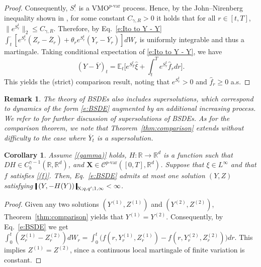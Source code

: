 \documentclass[11pt,reqno]{amsart}
\newtheorem{corollary}[lemma]{Corollary}
\newtheorem{remark}[lemma]{Remark}
\numberwithin{equation}{section}
\def\R{\mathbb R}
\def\E{\mathbb E}
\newcommand{\shortthickbar}{%
  \vcenter{\hbox{\rule{1.8pt}{2.2ex}}}%
}
\newcommand{\thicknm}[1]{%
  \mathopen{\shortthickbar}%
  \mkern4mu #1 \mkern4mu%
  \mathclose{\shortthickbar}%
}
\begin{document}
\begin{proof}
Consequently, $S^t_{\bm\cdot}$ is a $\mathrm{VMO}^{p\text{-}\mathrm{var}}$ process. Hence, by the John--Nirenberg inequality shown in \cite[Theorem~3.4]{le2022quantitative}, for some constant $C_{\gamma,R} > 0$ it holds that for all $r\in[t,T]$, 
$
\|e^{S^{t}_{r}}\|_{2} \le C_{\gamma,R}.
$
Therefore, by Eq.~\eqref{e:Ito to Y - Y} $\int_{t}^{\bm\cdot} [ e^{S^{t}_{r}}(Z_r - \overline Z_r) + \theta_r e^{S^{t}_{r}} (Y_r - \overline Y_r) ] dW_r$ is uniformly integrable and thus a martingale. Taking conditional expectation of \eqref{e:Ito to Y - Y}, we have 
\begin{equation*}
(Y - \overline Y)_{t} = \E_{t} \Big[e^{S^{t}_{T}} \hat \xi + \int_{t}^{T} e^{S^{t}_{r}} \hat f_r dr \Big].
\end{equation*}
This yields the (strict) comparison result, noting that $e^{S_r^t} > 0$  and $\hat f_r \ge 0$ a.s.
\end{proof}

\begin{remark}\label{rem:comparison to sup solution}
The theory of BSDEs also includes supersolutions, which correspond to dynamics of the form \eqref{e:BSDE} augmented by an additional increasing process. We refer to \cite{el1997backward} for further discussion of supersolutions of BSDEs. As for the comparison theorem, we note that Theorem~\ref{thm:comparison} extends without difficulty to the case where $\overline Y_t$ is a supersolution.
\end{remark}

\begin{corollary}\label{cor:uniqueness}
Assume \ref{(gamma)} holds,  $H:\R\to\R^d$ is a function such that $DH\in C^{\gamma - 1}_{b}(\R,\R^d)$, and $\mathbf X \in \mathscr{C}^{p\text{-}\mathrm{var}}([0,T],\R^d)$. Suppose that $\xi \in L^{\infty}$ and that $f$ satisfies \ref{(f)}. Then, Eq.~\eqref{e:BSDE} admits at most one solution $(Y,Z)$ satisfying $\thicknm{(Y,-H(Y))}_{\mathrm X;q,q';1,\infty} < \infty$.
\end{corollary}

\begin{proof}
Given any two solutions $(Y^{(1)},Z^{(1)})$ and $(Y^{(2)},Z^{(2)})$, Theorem~\ref{thm:comparison} yields that $Y^{(1)} = Y^{(2)}$. Consequently, by  Eq.~\eqref{e:BSDE} we get $\int_{0}^{t}(Z^{(1)}_{r} -Z^{(2)}_{r})dW_{r} = \int_{0}^{t}\big(f(r,Y^{(1)}_r,Z^{(1)}_r) - f(r,Y^{(2)}_r,Z^{(2)}_r) \big) dr$. 
This implies $Z^{(1)} = Z^{(2)}$, since a continuous local martingale of finite variation is constant.
\end{proof}
\end{document}
